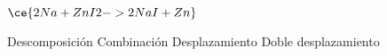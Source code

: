 $\ce{2Na + ZnI2 -> 2NaI + Zn}$

\begin{choices}
    \choice Descomposición
    \choice Combinación
    \CorrectChoice Desplazamiento
    \choice Doble desplazamiento
\end{choices}
